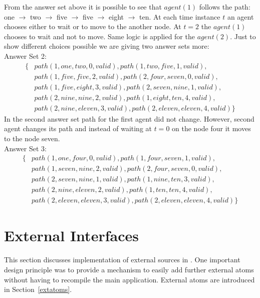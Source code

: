 \documentclass[a4paper, titlepage]{article}
\begin{document}
From the answer set above it is possible to see that 
$\mathit{agent(1)}$ follows the path:
one $\rightarrow$ two $\rightarrow$ five $\rightarrow$ five 
$\rightarrow$ eight $\rightarrow$ ten. At each time 
instance $t$ an agent chooses either to wait or to move to 
the another node. At $t=2$ the $\mathit{agent(1)}$ chooses 
to wait and not to move. Same logic is applied for the 
$\mathit{agent(2)}$. Just to show different choices 
possible we are 
giving two answer sets more:
\\Answer Set 2:
\begin{align*}
\{ & path(1,one,two,0,valid),path(1,two,five,1,valid),
\\ & path(1,five,five,2,valid),path(2,four,seven,0,valid),
\\ & path(1,five,eight,3,valid),path(2,seven,nine,1,valid),
\\ & path(2,nine,nine,2,valid),path(1,eight,ten,4,valid),
\\ & 
path(2,nine,eleven,3,valid),path(2,eleven,eleven,4,valid)\}
\end{align*}
In the second answer set path for the first agent did not 
change. However, second agent changes its path and instead 
of waiting at $t=0$ on the node four it moves to the node 
seven.  
\\Answer Set 3:
\begin{align*}
\{ & path(1,one,four,0,valid), path(1,four,seven,1,valid),
\\ & path(1,seven,nine,2,valid), path(2,four,seven,0,valid),
\\ & path(2,seven,nine,1,valid), 
path(1,nine,ten,3,valid),
\\ & path(2,nine,eleven,2,valid), path(1,ten,ten,4,valid),
\\ & 
path(2,eleven,eleven,3,valid),path(2,eleven,eleven,4,valid) 
\}
\end{align*} 

\section{External Interfaces}
\label{sec:externalInterfaces}
This section discusses implementation of external sources in \dlvhex{}. One important design principle was to provide a 
mechanism to easily add further external atoms without 
having to recompile the main application. External atoms are introduced in Section~\ref{extatoms}.
 
\end{document}
